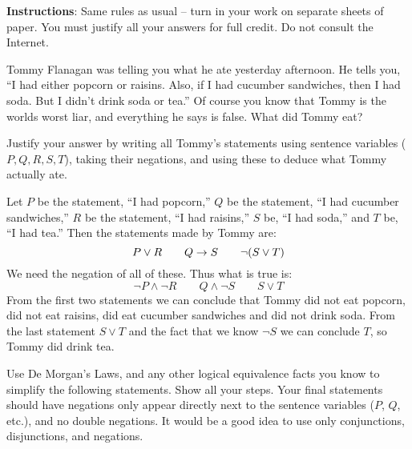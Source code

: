 \documentclass[10pt]{exam}
\begin{document}
\noindent \textbf{Instructions}: Same rules as usual -- turn in your work on separate sheets of paper.  You must justify all your answers for full credit.  Do not consult the Internet.

\begin{questions}
  \question[4] Tommy Flanagan was telling you what he ate yesterday afternoon.  He tells you, ``I had either popcorn or raisins.  Also, if I had cucumber sandwiches, then I had soda.  But I didn't drink soda or tea.''  Of course you know that Tommy is the worlds worst liar, and everything he says is false.  What did Tommy eat?

  Justify your answer by writing all Tommy's statements using sentence variables ($P, Q, R, S, T$), taking their negations, and using these to deduce what Tommy actually ate.

  \begin{solution}
  Let $P$ be the statement, ``I had popcorn,'' $Q$ be the statement, ``I had cucumber sandwiches,'' $R$ be the statement, ``I had raisins,'' $S$ be, ``I had soda,'' and $T$ be, ``I had tea.''  Then the statements made by Tommy are:
  \[P \vee R \qquad Q \rightarrow S \qquad \neg(S \vee T)\]
  We need the negation of all of these.  Thus what is true is:
  \[\neg P \wedge \neg R \qquad Q \wedge \neg S \qquad S \vee T\]
  From the first two statements we can conclude that Tommy did not eat popcorn, did not eat raisins, did eat cucumber sandwiches and did not drink soda.  From the last statement $S \vee T$ and the fact that we know $\neg S$ we can conclude $T$, so Tommy did drink tea.
  \end{solution}





  \question[8] Use De Morgan's Laws, and any other logical equivalence facts you know to simplify the following statements.  Show all your steps.  Your final statements should have negations only appear directly next to the sentence variables ($P$, $Q$, etc.), and no double negations.  It would be a good idea to use only conjunctions, disjunctions, and negations.
\end{questions}
\end{document}
